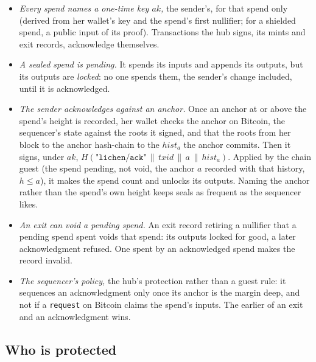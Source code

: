 \documentclass[11pt]{article}
\newcommand{\tx}[1]{\texttt{#1}}
\begin{document}
\begin{itemize}[leftmargin=1.5em]
\item \emph{Every spend names a one-time key $\mathit{ak}$,} the
  sender's, for that spend only (derived from her wallet's key and the
  spend's first nullifier; for a shielded spend, a public input of its
  proof). Transactions the hub signs, its mints and exit records,
  acknowledge themselves.
\item \emph{A sealed spend is pending.} It spends its inputs and appends
  its outputs, but its outputs are \emph{locked}: no one spends them,
  the sender's change included, until it is acknowledged.
\item \emph{The sender acknowledges against an anchor.} Once an anchor
  at or above the spend's height is recorded, her wallet checks the
  anchor on Bitcoin, the sequencer's state against the roots it signed,
  and that the roots from her block to the anchor hash-chain to the
  $\mathit{hist}_a$ the anchor commits. Then it signs, under
  $\mathit{ak}$, $H(\texttt{"lichen/ack"} \,\|\, \mathit{txid} \,\|\, a
  \,\|\, \mathit{hist}_a)$. Applied by the chain guest (the spend
  pending, not void, the anchor $a$ recorded with that history, $h \le
  a$), it makes the spend count and unlocks its outputs. Naming the
  anchor rather than the spend's own height keeps seals as frequent as
  the sequencer likes.
\item \emph{An exit can void a pending spend.} An exit record retiring
  a nullifier that a pending spend spent voids that spend: its outputs
  locked for good, a later acknowledgment refused. One spent by an
  acknowledged spend makes the record invalid.
\item \emph{The sequencer's policy,} the hub's protection rather than a
  guest rule: it sequences an acknowledgment only once its anchor is
  the margin deep, and not if a \tx{request} on Bitcoin claims the
  spend's inputs. The earlier of an exit and an acknowledgment wins.
\end{itemize}

\subsection{Who is protected}
\end{document}
